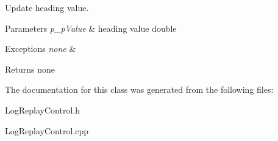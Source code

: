 Update heading value. 


\begin{DoxyParams}{Parameters}
{\em p\-\_\-p\-Value} & heading value double \\
\hline
\end{DoxyParams}

\begin{DoxyExceptions}{Exceptions}
{\em none} & \\
\hline
\end{DoxyExceptions}
\begin{DoxyReturn}{Returns}
none 
\end{DoxyReturn}


The documentation for this class was generated from the following files\-:\begin{DoxyCompactItemize}
\item 
Log\-Replay\-Control.\-h\item 
Log\-Replay\-Control.\-cpp\end{DoxyCompactItemize}

